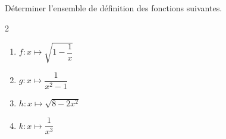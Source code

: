 \begin{exo}{}
	Déterminer l'ensemble de définition des fonctions suivantes.
	\vspace*{-2mm}
	\begin{multicols}{2}
	\begin{enumerate}
		\item $f : x \mapsto \sqrt{1 - \dfrac{1}{x}}$
		\item $g : x \mapsto \dfrac{1}{x^2 - 1}$
		\item $h : x \mapsto \sqrt{8 - 2x^2}$
		\item $k : x \mapsto \dfrac{1}{x^3}$
	\end{enumerate}
	\end{multicols}\vspace*{-2mm}
\end{exo}
